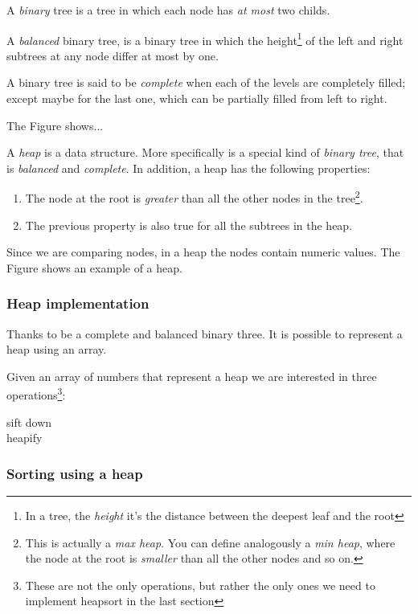 A \emph{binary} tree is a tree in which each node has \emph{at most} two childs.

A \emph{balanced} binary tree, is a binary tree in which the height\footnote{In a tree, the \emph{height} it's the distance between the deepest leaf and the root} of the left and right subtrees at any node differ at most by one.

A binary tree is said to be \emph{complete} when each of the levels are completely filled; except maybe for the last one, which can be partially filled from left to right.

The Figure shows...

A \emph{heap} is a data structure.
More specifically is a special kind of \emph{binary tree}, that is \emph{balanced} and \emph{complete}.
In addition, a heap has the following properties:
\begin{enumerate}
 \item The node at the root is \emph{greater} than all the other nodes in the tree\footnote{This is actually a \emph{max heap}. You can define analogously a \emph{min heap}, where the node at the root is \emph{smaller} than all the other nodes and so on.}.
 \item The previous property is also true for all the subtrees in the heap.
\end{enumerate}

Since we are comparing nodes, in a heap the nodes contain numeric values. The Figure shows an example of a heap.

\subsubsection{Heap implementation}

Thanks to be a complete and balanced binary three. It is possible to represent a heap using an array.

Given an array of numbers that represent a heap we are interested in three operations\footnote{These are not the only operations, but rather the only ones we need to implement heapsort in the last section}:

\begin{description}
 \item[sift down]
 \item[heapify]
\end{description}


\subsubsection{Sorting using a heap}
